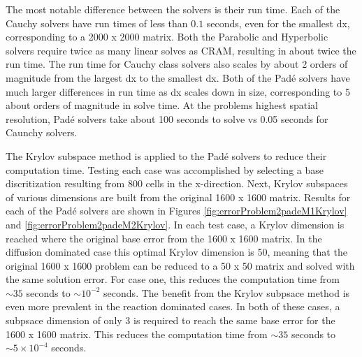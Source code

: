 The most notable difference between the solvers is their run time. Each of the Cauchy solvers have run times of less than $0.1$ seconds, even for the smallest dx, corresponding to a 2000 x 2000 matrix. Both the Parabolic and Hyperbolic solvers require twice as many linear solves as CRAM, resulting in about twice the run time. The run time for Cauchy class solvers also scales by about 2 orders of magnitude from the largest dx to the smallest dx. Both of the Pad\'e solvers have much larger differences in run time as dx scales down in size, corresponding to 5 about orders of magnitude in solve time. At the problems highest spatial resolution, Pad\'e solvers take about 100 seconds to solve vs 0.05 seconds for Caunchy solvers. 

The Krylov subspace method is applied to the Pad\'e solvers to reduce their computation time. Testing each case was accomplished by selecting a base discritization resulting from 800 cells in the x-direction. Next, Krylov subspaces of various dimensions are built from the original 1600 x 1600 matrix. Results for each of the Pad\'e solvers are shown in Figures \ref{fig:errorProblem2padeM1Krylov} and \ref{fig:errorProblem2padeM2Krylov}. In each test case, a Krylov dimension is reached where the original base error from the 1600 x 1600 matrix. In the diffusion dominated case this optimal Krylov dimension is 50, meaning that the original 1600 x 1600 problem can be reduced to a 50 x 50 matrix and solved with the same solution error. For case one, this reduces the computation time from $\sim35$ seconds to $\sim 10^{-2}$ seconds. The benefit from the Krylov subpsace method is even more prevalent in the reaction dominated cases. In both of these cases, a subpsace dimension of only 3 is required to reach the same base error for the 1600 x 1600 matrix. This reduces the computation time from $\sim 35$ seconds to $\sim 5\times 10^{-4}$ seconds. 

